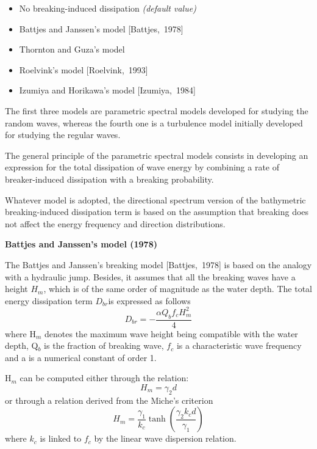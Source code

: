 \begin{itemize}
\item  No breaking-induced dissipation \textit{(default value)}

\item \textit{ }Battjes and Janssen's model [Battjes,~1978]

\item  Thornton and Guza's model \cite{Thornton1983}

\item  Roelvink's model [Roelvink,~1993]

\item  Izumiya and Horikawa's model [Izumiya,~1984]
\end{itemize}

The first three models are parametric spectral models developed for studying the random waves, whereas the fourth one is a turbulence model initially developed for studying the regular waves.

 The general principle of the parametric spectral models consists in developing an expression for the total dissipation of wave energy by combining a rate of breaker-induced dissipation with a breaking probability.

 Whatever model is adopted, the directional spectrum version of the bathymetric breaking-induced dissipation term is based on the assumption that breaking does not affect the energy frequency and direction distributions.


{\bf  Battjes and Janssen's model (1978)}

 The Battjes and Janssen's breaking model [Battjes,~1978] is based on the analogy with a hydraulic jump. Besides, it assumes that all the breaking waves have a height $H_{m} $, which is of the same order of magnitude as the water depth. The total energy dissipation term $D_{br} $is expressed as follows
\begin{equation} \label{GrindEQ__4_44_}
D_{br} =-\frac{\alpha Q_{b} f_{c} H_{m}^{2} }{4}
\end{equation}
where H${}_{m}$ denotes the maximum wave height being compatible with the water depth, Q${}_{b}$ is the fraction of breaking wave, $f_{c} $ is a characteristic wave frequency and a is a numerical constant of order 1.

 H${}_{m}$ can be computed either through the relation:
\begin{equation} \label{GrindEQ__4_45_}
H_{m} =\gamma _{2} d
\end{equation}
or through a relation derived from the Miche's criterion
\begin{equation} \label{GrindEQ__4_46_}
H_{m} =\frac{\gamma _{1} }{k_{c} } \tanh \left(\frac{\gamma _{2} k_{c} d}{\gamma _{1} } \right)
\end{equation}
where $k_{c} $ is linked to $f_{c} $ by the linear wave dispersion relation.

